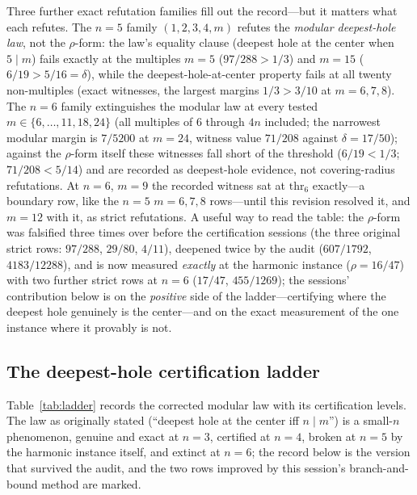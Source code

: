 Three further exact refutation families fill out the record---but it
matters what each refutes. The $n=5$ family $(1,2,3,4,m)$ refutes the
\emph{modular deepest-hole law}, not the $\rho$-form: the law's
equality clause (deepest hole at the center when $5\mid m$) fails
exactly at the multiples $m=5$ ($97/288>1/3$) and $m=15$
($6/19>5/16=\delta$), while the deepest-hole-at-center property fails
at all twenty non-multiples (exact witnesses, the largest margins
$1/3>3/10$ at $m=6,7,8$). The $n=6$ family extinguishes the modular law
at every tested $m\in\{6,\dots,11,18,24\}$ (all multiples of $6$
through $4n$ included; the narrowest modular margin is $7/5200$ at
$m=24$, witness value $71/208$ against $\delta=17/50$); against the
$\rho$-form itself these witnesses fall short of the threshold
($6/19<1/3$; $71/208<5/14$) and are recorded as deepest-hole evidence,
not covering-radius refutations. At $n=6$, $m=9$ the recorded witness sat at
$\mathrm{thr}_6$ exactly---a boundary row, like the $n=5$ $m=6,7,8$
rows---until this revision resolved it, and $m=12$ with it, as strict
refutations. A useful way to read the table: the $\rho$-form was
falsified three times over before the certification sessions (the three
original strict rows: $97/288$, $29/80$, $4/11$), deepened twice by the
audit ($607/1792$, $4183/12288$), and is now measured \emph{exactly} at
the harmonic instance ($\rho=16/47$) with two further strict rows at
$n=6$ ($17/47$, $455/1269$); the sessions' contribution below is on the
\emph{positive} side of the ladder---certifying where the deepest hole
genuinely is the center---and on the exact measurement of the one
instance where it provably is not.

\subsection{The deepest-hole certification ladder}

Table~\ref{tab:ladder} records the corrected modular law with its
certification levels. The law as originally stated (``deepest hole at
the center iff $n\mid m$'') is a small-$n$ phenomenon, genuine and exact
at $n=3$, certified at $n=4$, broken at $n=5$ by the harmonic instance
itself, and extinct at $n=6$; the record below is the version that
survived the audit, and the two rows improved by this session's
branch-and-bound method are marked.

